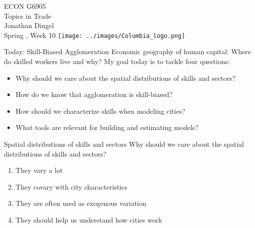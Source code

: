 \documentclass[11pt,notes=hide,aspectratio=169]{beamer}
\begin{document}
\begin{frame}[plain]
\begin{center}
\large
\textcolor{columbiadarkblue}{ECON G6905\\
Topics in Trade\\ 
Jonathan Dingel\\
Spring \the\year, Week 10}
\vfill 
\texttt{[image: ../images/Columbia\_logo.png]}
\end{center}
\end{frame}
\begin{frame}{Today: Skill-Biased Agglomeration}
Economic geography of human capital:
Where do skilled workers live and why?
\medskip
My goal today is to tackle four questions:
\begin{itemize}
	\item Why should we care about the spatial distributions of skills and sectors?
	\item How do we know that agglomeration is skill-biased?
	\item How should we characterize skills when modeling cities?
	\item What tools are relevant for building and estimating models?
\end{itemize}
\end{frame}
\begin{frame}{Spatial distributions of skills and sectors} 
Why should we care about the spatial distributions of skills and sectors?
\begin{enumerate}
	\item They vary a lot
	\item They covary with city characteristics
	\item They are often used as exogenous variation 
	\item They should help us understand how cities work
\end{enumerate}
\end{frame}
\end{document}
